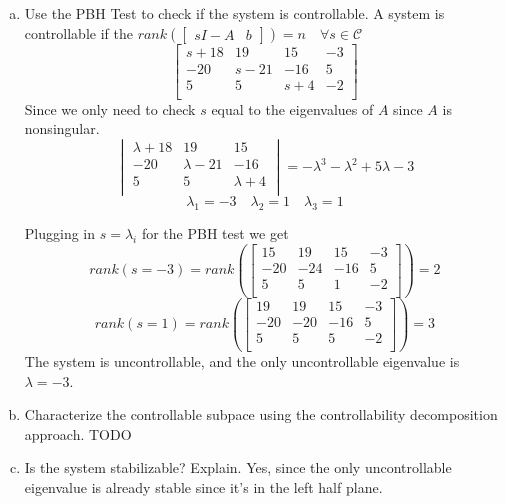 \documentclass{article}
\begin{document}
\begin{enumerate}[(a)]
\item Use the PBH Test to check if the system is controllable.
\newline
\newline
A system is controllable if the $rank\left(\begin{bmatrix} sI - A & b \end{bmatrix}\right) = n \quad \forall s \in \mathcal{C}$
$$
\begin{bmatrix}
s + 18 & 19   &  15 & -3 \\
   -20 & s-21 & -16 &  5 \\
     5 & 5    & s+4 & -2 \\
\end{bmatrix}
$$
Since we only need to check $s$ equal to the eigenvalues of $A$ since $A$ is nonsingular.
$$
\begin{vmatrix}
\lambda + 18 & 19   &  15 \\
   -20 & \lambda-21 & -16 \\
     5 & 5    & \lambda+4 \\
\end{vmatrix}
=
-\lambda^3 - \lambda^2 +5 \lambda -3
$$
$$
\lambda_1 = -3
\quad
\lambda_2 =  1
\quad 
\lambda_3 =  1
$$

Plugging in $s=\lambda_i$ for the PBH test we get
$$
rank(s=-3) =
rank\left(
\begin{bmatrix}
 15 &  19 &  15 & -3 \\
-20 & -24 & -16 &  5 \\
  5 &   5 &   1 & -2 \\
\end{bmatrix}
\right) = 2
$$
$$
rank(s=1) =
rank\left(
\begin{bmatrix}
 19 &  19 &  15 & -3 \\
-20 & -20 & -16 &  5 \\
  5 &   5 &   5 & -2 \\
\end{bmatrix}
\right) = 3
$$
The system is uncontrollable, and the only uncontrollable eigenvalue is $\lambda = -3$.


\item Characterize the controllable subpace using the controllability decomposition approach.
\newline
\newline
TODO


\item Is the system stabilizable? Explain.
\newline
\newline
Yes, since the only uncontrollable eigenvalue is already stable since it's in the left half plane.


\end{enumerate}
\end{document}
